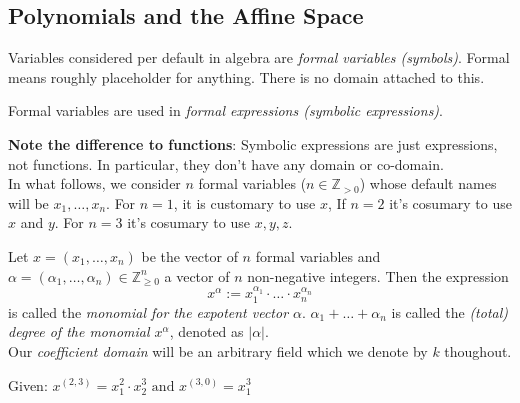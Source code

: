 \subsection{Polynomials and the Affine Space} 

Variables considered per default in algebra are \textit{formal variables (symbols)}. Formal means roughly placeholder for anything. There is no domain attached to this. 

Formal variables are used in \textit{formal expressions (symbolic expressions)}. 

\textbf{Note the difference to functions}: Symbolic expressions are just expressions, not functions. In particular, they \hspace*{5.2cm}don't have any domain or co-domain.  \\

In what follows, we consider $n$ formal variables ($n \in \mathbb{Z}_{>0}$) whose default names will be $x_1, \ldots, x_n$.  For $n=1$, it is customary to use $x$, If $n=2$ it's cosumary to use $x$ and $y$. For $n = 3$ it's cosumary to use $x, y, z$. 

\begin{definition}[title = Definition 1.1.1] 
    Let $x = (x_1, \dots, x_n)$ be the vector of $n$ formal variables and $\alpha = (\alpha_1, \dots, \alpha_n) \in \mathbb{Z}_{\geq 0}^n$ a vector of $n$ non-negative integers. Then the expression 
    \[x^{\alpha} := x_1^{\alpha_1} \cdot \ldots \cdot x_n^{\alpha_n}\] 
    is called the \textit{monomial for the expotent vector $\alpha$}.  $\alpha_1 + \ldots + \alpha_n$ is called the \textit{(total) degree of the monomial $x^{\alpha}$}, denoted as $|\alpha|$. \\[0.3em] 
    Our \textit{coefficient domain} will be an arbitrary field which we denote by $k$ thoughout.
\end{definition}

\clearpage

\begin{example}
    Given: $x^{(2, 3)} = x_1^2 \cdot x_2^3 \text{ and } x^{(3, 0)} = x_1^3$ 
    \begin{center}
    \end{center}
\end{example}

